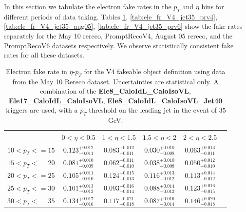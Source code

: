 In this section we tabulate the electron fake rates in the $p_{T}$ and $\eta$ bins for different 
periods of data taking. Tables \ref{tab:ele_fr_V4_jet35_m10}, \ref{tab:ele_fr_V4_jet35_prv4}, 
\ref{tab:ele_fr_V4_jet35_aug05}, \ref{tab:ele_fr_V4_jet35_prv6} show the fake rates separately 
for the May 10 rereco, PromptRecoV4, August 05 rereco, and the PromptRecoV6 datasets respectively.
We observe statistically consistent fake rates for all these datasets.

\begin{table}[!htbp]
\begin{center}
\begin{tabular}{|c|c|c|c|c|c|}

\hline
                       &        $0<\eta<0.5$              &        $1<\eta<1.5$              &        $1.5<\eta<2$              &        $2<\eta<2.5$               \\
\hline
   $10 < p_{T} <= 15$ &        $0.123^{+0.012}_{-0.011}$ &        $0.083^{+0.012}_{-0.011}$ &        $0.030^{+0.010}_{-0.008}$ &        $0.063^{+0.013}_{-0.011}$  \\ 
 \hline
    $15 < p_{T} <= 20$ &        $0.081^{+0.010}_{-0.009}$ &        $0.062^{+0.011}_{-0.010}$ &        $0.038^{+0.010}_{-0.008}$ &        $0.050^{+0.012}_{-0.010}$  \\ 
 \hline
    $20 < p_{T} <= 25$ &        $0.105^{+0.011}_{-0.010}$ &        $0.124^{+0.015}_{-0.013}$ &        $0.116^{+0.013}_{-0.012}$ &        $0.113^{+0.014}_{-0.012}$  \\ 
 \hline
    $25 < p_{T} <= 30$ &        $0.101^{+0.013}_{-0.012}$ &        $0.093^{+0.016}_{-0.014}$ &        $0.088^{+0.014}_{-0.012}$ &        $0.123^{+0.016}_{-0.015}$  \\ 
 \hline
    $30 < p_{T} <= 35$ &        $0.134^{+0.017}_{-0.016}$ &        $0.117^{+0.021}_{-0.018}$ &        $0.087^{+0.016}_{-0.014}$ &        $0.146^{+0.020}_{-0.018}$  \\ 
 \hline

\end{tabular}
\caption{Electron fake rate in $\eta$-$p_T$ for the V4 fakeable object definition using data from the May 10 Rereco dataset. 
Uncertainties are statistical only. A combination of the {\bf Ele8\_CaloIdL\_CaloIsoVL}, {\bf Ele17\_CaloIdL\_CaloIsoVL}, 
{\bf Ele8\_CaloIdL\_CaloIsoVL\_Jet40} triggers are used, with a $p_{T}$ threshold on the leading jet in
the event of $35$ GeV. }
\label{tab:ele_fr_V4_jet35_m10}
\end{center}
\end{table}

